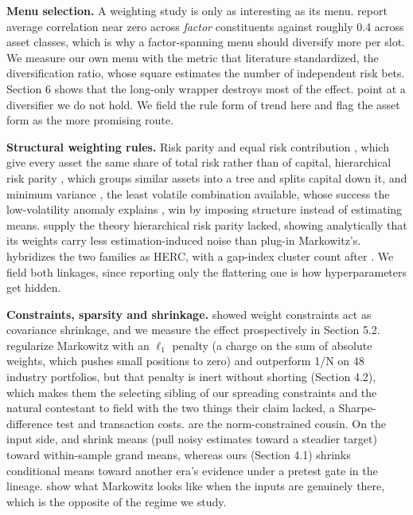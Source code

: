 \documentclass[12pt,letterpaper]{article}
\newcommand{\nuevo}[1]{{\color{nuevoc}#1}}
\newcommand{\head}[1]{\noindent\textbf{#1}\hspace{0.5em}\ignorespaces}
\begin{document}
\head{Menu selection.} A weighting study is only as interesting as its menu.
\citet{ilmanen2012} report average correlation near zero across \emph{factor}
constituents against roughly 0.4 across asset classes, which is why a
factor-spanning menu should diversify more per slot. We measure our own menu with
the metric that literature standardized, the \citet{choueifaty2008}
diversification ratio, whose square estimates the number of independent risk bets.
Section 6 shows that the long-only wrapper destroys most of the effect.
\citet{hurst2017} point at a diversifier we do not hold. We field the rule form of
trend here and flag the asset form as the more promising route.

\head{Structural weighting rules.} Risk parity and equal risk contribution
\citep{maillard2010,asness2012}\nuevo{, which give every asset the same share of total risk
rather than of capital}, hierarchical risk parity \citep{lopezdeprado2016}\nuevo{, which groups
similar assets into a tree and splits capital down it,}
and minimum variance \citep{clarke2006}\nuevo{, the least volatile combination available}, whose success the low-volatility anomaly
explains \citep{haugen1991,frazzini2014}, win by imposing structure instead of
estimating means. \citet{antonov2025} supply the theory hierarchical risk parity
lacked, showing analytically that its weights carry less estimation-induced noise
than plug-in Markowitz's. \citet{raffinot2018} hybridizes the two families as
HERC, with a gap-index cluster count after \citet{tibshirani2001}. We field both
linkages, since reporting only the flattering one is how hyperparameters get
hidden.

\head{Constraints, sparsity and shrinkage.} \citet{jagannathan2003} showed weight
constraints act as covariance shrinkage, and we measure the effect prospectively
in Section 5.2. \citet{brodie2009} regularize Markowitz with an $\ell_1$ penalty\nuevo{ (a charge on the sum
of absolute weights, which pushes small positions to zero)}
and outperform 1/N on 48 industry portfolios, but that penalty is inert without
shorting (Section 4.2), which makes them the selecting sibling of our spreading
constraints and the natural contestant to field with the two things their claim
lacked, a Sharpe-difference test and transaction costs.
\citet{demiguel2009norm} are the norm-constrained cousin. On the input side,
\citet{jorion1986} and \citet{frost1986} shrink means\nuevo{ (pull noisy estimates toward a
steadier target)} toward within-sample grand
means, whereas ours (Section 4.1) shrinks conditional means toward another era's
evidence under a pretest gate in the \citet{judge1978} lineage.
\citet{boyd2024} show what Markowitz looks like when the inputs are genuinely
there, which is the opposite of the regime we study.
\end{document}
